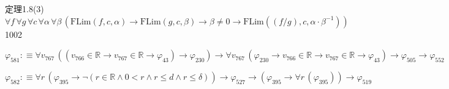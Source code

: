 \begin{fullproof}{定理1.8(3)}{$\forall f\,\forall g\,\forall c\,\forall \alpha\,\forall \beta\,(\mathrm{FLim}(f,c,\alpha) \to \mathrm{FLim}(g,c,\beta) \to \beta \neq 0 \to \mathrm{FLim}((f / g),c,\alpha \cdot \beta^{-1}))$}{1002}
\begin{abbrevlist}
\item $\varphi_{581} :\equiv \forall v_{767}\,((v_{766} \in \mathbb{R} \to v_{767} \in \mathbb{R} \to \varphi_{43}) \to \varphi_{230}) \to \forall v_{767}\,(\varphi_{230} \to v_{766} \in \mathbb{R} \to v_{767} \in \mathbb{R} \to \varphi_{43}) \to \varphi_{505} \to \varphi_{552}$
\item $\varphi_{582} :\equiv \forall r\,(\varphi_{395} \to \neg (r \in \mathbb{R} \land 0 < r \land r \leq d \land r \leq \delta)) \to \varphi_{527} \to (\varphi_{395} \to \forall r\,(\varphi_{395})) \to \varphi_{519}$
\end{abbrevlist}
\end{fullproof}
